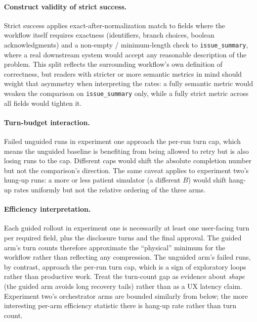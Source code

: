 \documentclass[11pt,a4paper]{article}
\begin{document}
\paragraph{Construct validity of strict success.}
Strict success applies exact-after-normalization match to fields where the workflow itself requires exactness (identifiers, branch choices, boolean acknowledgments) and a non-empty / minimum-length check to \texttt{issue\_summary}, where a real downstream system would accept any reasonable description of the problem. This split reflects the surrounding workflow's own definition of correctness, but readers with stricter or more semantic metrics in mind should weight that asymmetry when interpreting the rates: a fully semantic metric would weaken the comparison on \texttt{issue\_summary} only, while a fully strict metric across all fields would tighten it.

\paragraph{Turn-budget interaction.}
Failed unguided runs in experiment one approach the per-run turn cap, which means the unguided baseline is benefiting from being allowed to retry but is also losing runs to the cap. Different caps would shift the absolute completion number but not the comparison's direction. The same caveat applies to experiment two's hung-up runs: a more or less patient simulator (a different $B$) would shift hang-up rates uniformly but not the relative ordering of the three arms.

\paragraph{Efficiency interpretation.}
Each guided rollout in experiment one is necessarily at least one user-facing turn per required field, plus the disclosure turns and the final approval. The guided arm's turn counts therefore approximate the ``physical'' minimum for the workflow rather than reflecting any compression. The unguided arm's failed runs, by contrast, approach the per-run turn cap, which is a sign of exploratory loops rather than productive work. Treat the turn-count gap as evidence about \emph{shape} (the guided arm avoids long recovery tails) rather than as a UX latency claim. Experiment two's orchestrator arms are bounded similarly from below; the more interesting per-arm efficiency statistic there is hang-up rate rather than turn count.
\end{document}
